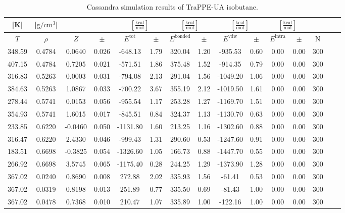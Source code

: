 \documentclass[%
 aip,
 jcp,
 sd,%
 amsmath,amssymb,
]{revtex4-1}
\begin{document}
\begin{table*}[!htbp]
\centering
\caption{Cassandra simulation results of TraPPE-UA isobutane.}
\label{tab:sim-res-TraPPE-iC4}
\begin{ruledtabular}
\begin{tabular}{ccccccccccccccc}
[K] & [$\mathrm{g/cm^3}$] &  &  & \multicolumn{2}{c}{$[\frac{\mathrm{kcal}}{\mathrm{mol}}]$} & \multicolumn{2}{c}{$[\frac{\mathrm{kcal}}{\mathrm{mol}}]$} & \multicolumn{2}{c}{$[\frac{\mathrm{kcal}}{\mathrm{mol}}]$} &\multicolumn{2}{c}{$[\frac{\mathrm{kcal}}{\mathrm{mol}}]$} & \\
\hline
$T$ & $\rho$ & $Z$ & $\pm$ & $E^{\mathrm{tot}}$ & $\pm$ & $E^{\mathrm{bonded}}$ & $\pm$ & $E^{\mathrm{vdw}}$ & $\pm$ & $E^{\mathrm{intra}}$ & $\pm$ & N\\
\hline
348.59	&	0.4784	&	0.0640	&	0.026	&	-648.13	&	1.79	&	320.04	&	1.20	&	-935.53	&	0.60	&	0.00	&	0.00	&	300	\\
407.15	&	0.4784	&	0.7205	&	0.021	&	-571.51	&	1.86	&	375.48	&	1.52	&	-914.35	&	0.79	&	0.00	&	0.00	&	300	\\
316.83	&	0.5263	&	0.0003	&	0.031	&	-794.08	&	2.13	&	291.04	&	1.56	&	-1049.20	&	1.06	&	0.00	&	0.00	&	300	\\
384.63	&	0.5263	&	1.0867	&	0.033	&	-700.22	&	3.67	&	355.19	&	2.12	&	-1019.50	&	1.61	&	0.00	&	0.00	&	300	\\
278.44	&	0.5741	&	0.0153	&	0.056	&	-955.54	&	1.17	&	253.28	&	1.27	&	-1169.70	&	1.51	&	0.00	&	0.00	&	300	\\
354.93	&	0.5741	&	1.6015	&	0.017	&	-845.51	&	0.84	&	324.37	&	1.13	&	-1130.70	&	0.63	&	0.00	&	0.00	&	300	\\
233.85	&	0.6220	&	-0.0460	&	0.050	&	-1131.80	&	1.60	&	213.25	&	1.16	&	-1302.60	&	0.88	&	0.00	&	0.00	&	300	\\
316.47	&	0.6220	&	2.4330	&	0.046	&	-999.43	&	1.31	&	290.60	&	0.53	&	-1247.60	&	0.91	&	0.00	&	0.00	&	300	\\
183.51	&	0.6698	&	-0.3825	&	0.054	&	-1326.60	&	1.05	&	166.73	&	0.88	&	-1447.70	&	0.55	&	0.00	&	0.00	&	300	\\
266.92	&	0.6698	&	3.5745	&	0.065	&	-1175.40	&	0.28	&	244.25	&	1.29	&	-1373.90	&	1.28	&	0.00	&	0.00	&	300	\\
367.02	&	0.0240	&	0.8690	&	0.008	&	272.88	&	2.02	&	335.93	&	1.56	&	-61.41	&	0.53	&	0.00	&	0.00	&	300	\\
367.02	&	0.0319	&	0.8198	&	0.013	&	251.89	&	0.77	&	335.50	&	0.69	&	-81.43	&	1.00	&	0.00	&	0.00	&	300	\\
367.02	&	0.0478	&	0.7368	&	0.010	&	210.47	&	1.07	&	335.89	&	1.00	&	-122.16	&	1.00	&	0.00	&	0.00	&	300	\\

\end{tabular}
\end{ruledtabular}
\end{table*}
\end{document}
